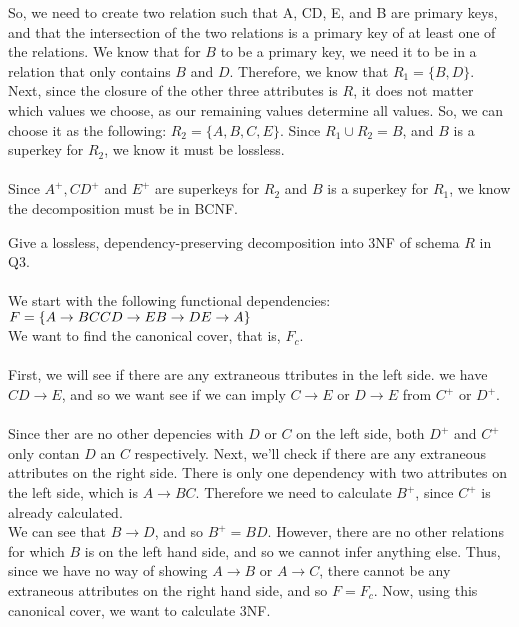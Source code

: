 \documentclass[a4 paper]{article}
\begin{document}
So, we need to create two relation such that A, CD, E, and B are primary keys, and that the intersection of the two relations is a primary key of at least one of the relations. We know that for $B$ to be a primary key, we need it to be in a relation that only contains $B$ and $D$. Therefore, we know that $R_1=\{B,D\}$. Next, since the closure of the other three attributes is $R$, it does not matter which values we choose, as our remaining values determine all values. So, we can choose it as the following: $R_2=\{A,B,C,E\}$. Since $R_1\cup R_2={B}$, and $B$ is a superkey for $R_2$, we know it must be lossless.\\\\
Since $A^+, CD^+$ and $E^+$ are superkeys for $R_2$ and $B$ is a superkey for $R_1$, we know the decomposition must be in BCNF.






Give a lossless, dependency-preserving decomposition into 3NF of schema $R$ in Q3.\\\\

We start with the following functional dependencies:
\\$F = \{
\\A \rightarrow BC\\
CD \rightarrow E\\
B \rightarrow D\\
E \rightarrow A\}$\\
We want to find the canonical cover, that is, $F_c$.\\\\
First, we will see if there are any extraneous ttributes in the left side. we have $CD\rightarrow E$, and so we want see if we can imply $C\rightarrow E$ or $D\rightarrow E$ from $C^+$ or $D^+$.\\\\
Since ther are no other depencies with $D$ or $C$ on the left side, both $D^+$ and $C^+$ only contan $D$ an $C$ respectively. Next, we'll check if there  are any extraneous attributes on the right side. There is only one dependency with two attributes on the left side, which is $A\rightarrow BC$. Therefore we need to calculate $B^+$, since $C^+$ is already calculated.\\
We can see that $B\rightarrow D$, and so $B^+=BD$. However, there are no other relations for which $B$ is on the left hand side, and so we cannot infer anything else. Thus, since we have no way of showing $A\rightarrow B$ or $A\rightarrow C$, there cannot be any extraneous attributes on the right hand side, and so $F=F_c$. Now, using this canonical cover, we want to calculate 3NF.
\end{document}
